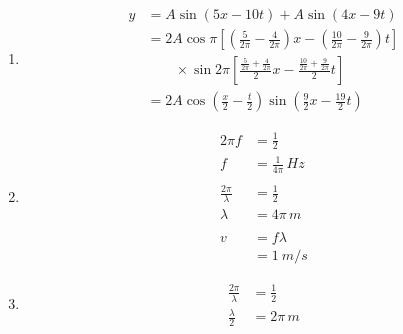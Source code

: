 \documentclass{article}
\begin{document}
\begin{enumerate}
  \item

        \begin{align*}
          y & = A \sin (5 x - 10 t) + A \sin (4 x - 9 t)                                                                                             \\
            & = 2 A \cos \pi \left[ \left( \frac{5}{2 \pi} - \frac{4}{2 \pi} \right) x - \left( \frac{10}{2 \pi} - \frac{9}{2 \pi} \right) t \right] \\
            & \qquad \times \sin 2 \pi \left[ \frac{\frac{5}{2 \pi} + \frac{4}{2 \pi}}{2} x - \frac{\frac{10}{2 \pi} + \frac{9}{2 \pi}}{2} t \right] \\
            & = 2 A \cos \left( \frac{x}{2} - \frac{t}{2} \right) \sin \left( \frac{9}{2} x - \frac{19}{2} t \right)
        \end{align*}

  \item

        \begin{align*}
          2 \pi f               & = \frac{1}{2}                 \\
          f                     & = \frac{1}{4 \pi} \,\unit{Hz} \\ \\
          \frac{2 \pi}{\lambda} & = \frac{1}{2}                 \\
          \lambda               & = 4 \pi \,\unit{m}            \\ \\
          v                     & = f \lambda                   \\
                                & = \qty{1}{m/s}
        \end{align*}

  \item

        \begin{align*}
          \frac{2 \pi}{\lambda} & = \frac{1}{2}      \\
          \frac{\lambda}{2}     & = 2 \pi \,\unit{m}
        \end{align*}
\end{enumerate}

\subsection{}
\end{document}

